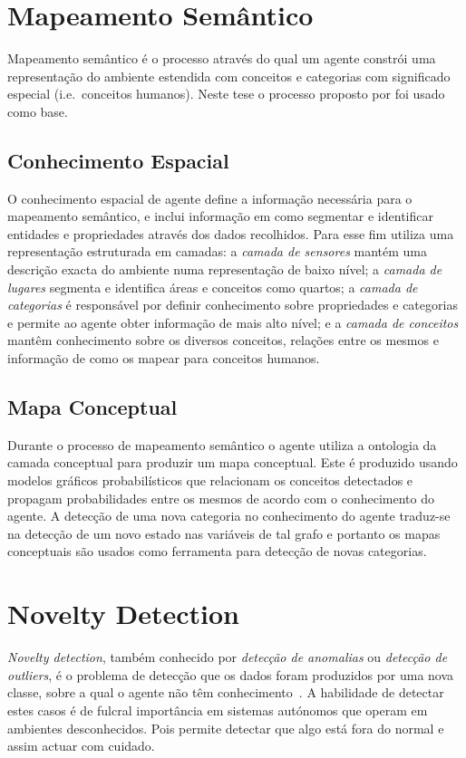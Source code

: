 \documentclass[9pt,a4paper]{extarticle}
\begin{document}
\begin{multicols}{2}
\section{Mapeamento Semântico}
Mapeamento semântico é o processo através do qual um agente constrói uma representação do ambiente
estendida com conceitos e categorias com significado especial (i.e.\ conceitos humanos).
Neste tese o processo proposto por \cite{pronobis2011phd} foi usado como base.

\subsection{Conhecimento Espacial}
O conhecimento espacial de agente define a informação necessária para o mapeamento semântico,
e inclui informação em como segmentar e identificar entidades e propriedades através dos dados
recolhidos.
Para esse fim \cite{pronobis2011semmap} utiliza uma representação estruturada em camadas:
a \emph{camada de sensores} mantém uma descrição exacta do ambiente numa representação
de baixo nível;
a \emph{camada de lugares} segmenta e identifica áreas e conceitos como quartos;
a \emph{camada de categorias} é responsável por definir conhecimento sobre propriedades e categorias
e permite ao agente obter informação de mais alto nível;
e a \emph{camada de conceitos} mantêm conhecimento sobre os diversos conceitos, relações entre os mesmos
e informação de como os mapear para conceitos humanos.

\subsection{Mapa Conceptual}
Durante o processo de mapeamento semântico o agente utiliza a ontologia da camada conceptual para produzir
um mapa conceptual. Este é produzido usando modelos gráficos probabilísticos que relacionam
os conceitos detectados e propagam probabilidades entre os mesmos de acordo com o conhecimento do agente.
A detecção de uma nova categoria no conhecimento do agente traduz-se na detecção de um novo estado nas
variáveis de tal grafo e portanto os mapas conceptuais são usados como ferramenta para detecção de novas
categorias.

\section{Novelty Detection}
\emph{Novelty detection}, também conhecido por \emph{detecção de anomalias} ou \emph{detecção de outliers},
é o problema de detecção que os dados foram produzidos por uma nova classe,
sobre a qual o agente não têm conhecimento~\cite{markou2003novelty}.
A habilidade de detectar estes casos é de fulcral importância em sistemas autónomos que operam em ambientes
desconhecidos. Pois permite detectar que algo está fora do normal e assim actuar com cuidado.


\end{multicols}
\end{document}
